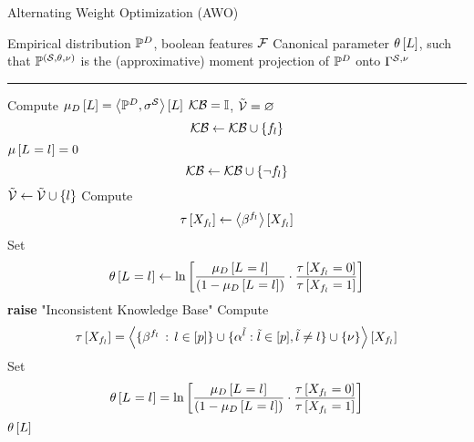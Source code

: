 \begin{algorithm}[hbt!]
    \caption{Alternating Weight Optimization (AWO)}\label{alg:AWO}
    \begin{algorithmic}
        \Require Empirical distribution $\mathbb{P}^{D}$, boolean features $\mathcal{F}$ %
        \Ensure Canonical parameter $\theta\left[L\right]$, such that $\mathbb{P}^{(\mathcal{S},\theta,\nu)}$ is the (approximative) moment projection of $\mathbb{P}^{D}$ onto $\Gamma^{\mathcal{S},\nu}$
        \hrule
        \State Compute $\mu_{D}\left[L\right]= \left\langle \mathbb{P}^{D},\sigma^{\mathcal{S}}\right\rangle \left[ L \right]$
        \State $\mathcal{KB} = \mathbb{I}$, $\tilde{\mathcal{V}}=\varnothing$
        \For{$\selindexin$}
                \[ \mathcal{KB} \leftarrow \mathcal{KB} \cup \{f_{l}\}\]
            \ElsIf
                    {$\mu\left[L_{}=l_{}\right]=0$}
                \[ \mathcal{KB} \leftarrow \mathcal{KB} \cup \{\lnot f_{l}\}\]
            \Else
                \State $\tilde{\mathcal{V}}\leftarrow \tilde{\mathcal{V}} \cup \{l\}$
            \EndIf
        \EndFor
        \For{$\selindex\in\secnodes$}
            \State Compute
            \[ \tau\left[X_{f_{l}}\right]
            \leftarrow \left\langle \beta^{f_{l}}\right\rangle \left[ X_{f_{l}} \right] \]
            \State Set
            \begin{align*}
                \theta\left[L_{}=l_{}\right]
                \leftarrow \ln \left[ 
                    \frac{\mu_{D}\left[L_{}=l_{}\right]}{(1-\mu_{D}\left[L_{}=l_{}\right])}
                    \cdot \frac{\tau\left[X_{f_{l}}=0\right]}{\tau\left[X_{f_{l}}=1\right]}
                 \right]
            \end{align*}
        \EndFor
            \State \textbf{raise} "Inconsistent Knowledge Base"
        \EndIf
            \For{$\selindex\in\secnodes$}
                \State Compute
                \begin{align*}
                    \tau\left[X_{f_{l}}\right]
                    = \left\langle \{\beta^{f_{l}} \, : \, l\in[p]\}
                    \cup\{\alpha^{\tilde{l}} : \tilde{l} \in [p], \tilde{l}\neq l\}
                    \cup\{\nu\}\right\rangle \left[ X_{f_{l}} \right]
                \end{align*}
                \State Set
                \begin{align*}
                    \theta\left[L_{}=l_{}\right] = \ln \left[ 
                        \frac{\mu_{D}\left[L_{}=l_{}\right]}{(1-\mu_{D}\left[L_{}=l_{}\right])}
                        \cdot \frac{\tau\left[X_{f_{l}}=0\right]}{\tau\left[X_{f_{l}}=1\right]}
                     \right]
                \end{align*}
            \EndFor
        \EndWhile
        \State \Return $\theta\left[L\right]$
    \end{algorithmic}
\end{algorithm}


